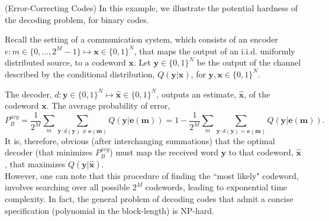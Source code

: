 \documentclass[letterpaper,english,10pt]{article}
\begin{document}
\begin{shaded*}
\begin{exmp}(Error-Correcting Codes)
In this example, we illustrate the potential hardness of the decoding problem, for binary codes.

Recall the setting of a communication system, which consists of an encoder $e:m\in \{0,\ldots,2^{M}-1\}\mapsto \mathbf{x}\in\{0,1\}^{N}$, that maps the output of an i.i.d. uniformly distributed source, to a codeword $\mathbf{x}$. Let $\mathbf{y}\in \{0,1\}^{N}$ be the output of the channel described by the conditional distribution, $Q(\mathbf{y}|\mathbf{x})$, for $\mathbf{y},\mathbf{x}\in \{0,1\}^{N}$.

The decoder, $d:\mathbf{y}\in \{0,1\}^{N}\mapsto \mathbf{\hat{x}}\in \{0,1\}^{N}$, outputs an estimate, $\mathbf{\hat{x}}$, of the codeword $\mathbf{x}$. The average probability of error,
\begin{equation*}
    P_B^{avg} = \frac{1}{2^M}\sum_{m}\sum_{\mathbf{y}:d(\mathbf{y})\neq \mathbf{e(m)}}Q(\mathbf{y}|\mathbf{e(m)}) = 1 - \frac{1}{2^M}\sum_{m}\sum_{\mathbf{y}:d(\mathbf{y})= \mathbf{e(m)}}Q(\mathbf{y}|\mathbf{e(m)}).
\end{equation*}
It is, therefore, obvious (after interchanging summations) that the optimal decoder (that minimizes $P_B^{avg}$) must map the received word $\mathbf{y}$ to that codeword, $\mathbf{\hat{x}}$, that maximizes $Q(\mathbf{y}|\mathbf{\hat{x}})$.\\
However, one can note that this procedure of finding the ``most likely" codeword, involves searching over all possible $2^M$ codewords, leading to exponential time complexity. In fact, the general problem of decoding codes that admit a concise specification (polynomial in the block-length) is NP-hard.
\end{exmp}
\end{shaded*}
\end{document}
